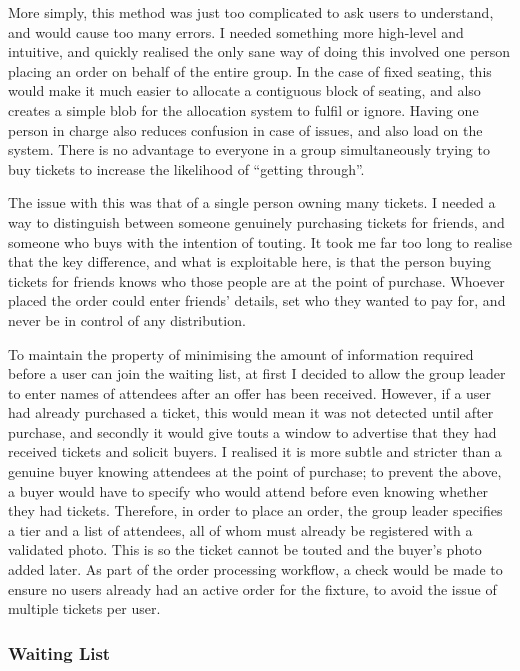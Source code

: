 \documentclass[12pt,a4paper]{bhamdissertation}
\begin{document}
More simply, this method was just too complicated to ask users to understand, and would cause too many errors. I needed something more high-level and intuitive, and quickly realised the only sane way of doing this involved one person placing an order on behalf of the entire group. In the case of fixed seating, this would make it much easier to allocate a contiguous block of seating, and also creates a simple blob for the allocation system to fulfil or ignore. Having one person in charge also reduces confusion in case of issues, and also load on the system. There is no advantage to everyone in a group simultaneously trying to buy tickets to increase the likelihood of ``getting through''.

The issue with this was that of a single person owning many tickets. I needed a way to distinguish between someone genuinely purchasing tickets for friends, and someone who buys with the intention of touting. It took me far too long to realise that the key difference, and what is exploitable here, is that the person buying tickets for friends knows who those people are at the point of purchase. Whoever placed the order could enter friends' details, set who they wanted to pay for, and never be in control of any distribution.

To maintain the property of minimising the amount of information required before a user can join the waiting list, at first I decided to allow the group leader to enter names of attendees after an offer has been received. However, if a user had already purchased a ticket, this would mean it was not detected until after purchase, and secondly it would give touts a window to advertise that they had received tickets and solicit buyers. I realised it is more subtle and stricter than a genuine buyer knowing attendees at the point of purchase; to prevent the above, a buyer would have to specify who would attend before even knowing whether they had tickets. Therefore, in order to place an order, the group leader specifies a tier and a list of attendees, all of whom must already be registered with a validated photo. This is so the ticket cannot be touted and the buyer's photo added later. As part of the order processing workflow, a check would be made to ensure no users already had an active order for the fixture, to avoid the issue of multiple tickets per user.

\subsubsection{Waiting List}
\end{document}
